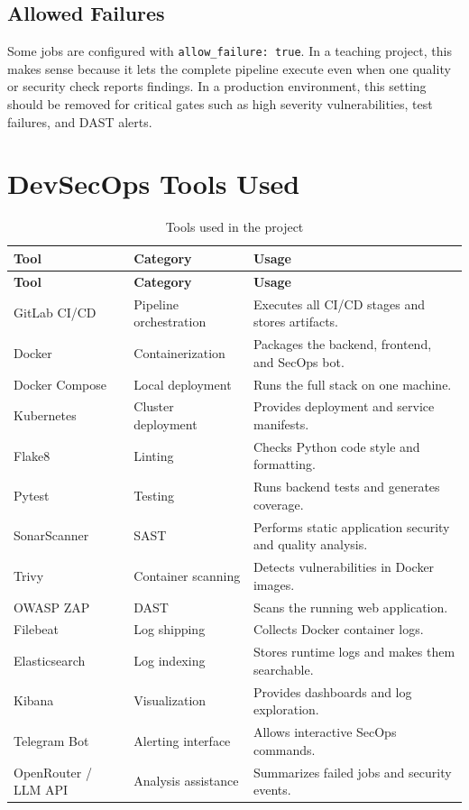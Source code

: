 \documentclass[12pt,a4paper]{report}
\begin{document}
\section{Allowed Failures}

Some jobs are configured with \texttt{allow\_failure: true}. In a teaching project, this makes sense because it lets the complete pipeline execute even when one quality or security check reports findings. In a production environment, this setting should be removed for critical gates such as high severity vulnerabilities, test failures, and DAST alerts.

\chapter{DevSecOps Tools Used}

\begin{longtable}{p{3.5cm}p{3.5cm}p{7cm}}
\caption{Tools used in the project} \\
\toprule
\textbf{Tool} & \textbf{Category} & \textbf{Usage} \\
\midrule
\endfirsthead
\toprule
\textbf{Tool} & \textbf{Category} & \textbf{Usage} \\
\midrule
\endhead
GitLab CI/CD & Pipeline orchestration & Executes all CI/CD stages and stores artifacts. \\
Docker & Containerization & Packages the backend, frontend, and SecOps bot. \\
Docker Compose & Local deployment & Runs the full stack on one machine. \\
Kubernetes & Cluster deployment & Provides deployment and service manifests. \\
Flake8 & Linting & Checks Python code style and formatting. \\
Pytest & Testing & Runs backend tests and generates coverage. \\
SonarScanner & SAST & Performs static application security and quality analysis. \\
Trivy & Container scanning & Detects vulnerabilities in Docker images. \\
OWASP ZAP & DAST & Scans the running web application. \\
Filebeat & Log shipping & Collects Docker container logs. \\
Elasticsearch & Log indexing & Stores runtime logs and makes them searchable. \\
Kibana & Visualization & Provides dashboards and log exploration. \\
Telegram Bot & Alerting interface & Allows interactive SecOps commands. \\
OpenRouter / LLM API & Analysis assistance & Summarizes failed jobs and security events. \\
\bottomrule
\end{longtable}
\end{document}
